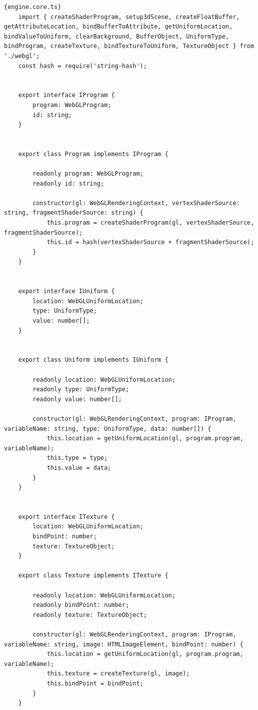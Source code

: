 \begin{lstlisting}{engine.core.ts}
    import { createShaderProgram, setup3dScene, createFloatBuffer, getAttributeLocation, bindBufferToAttribute, getUniformLocation, bindValueToUniform, clearBackground, BufferObject, UniformType, bindProgram, createTexture, bindTextureToUniform, TextureObject } from './webgl';
    const hash = require('string-hash');
    
    
    export interface IProgram {
        program: WebGLProgram;
        id: string;
    }
    
    
    export class Program implements IProgram {
    
        readonly program: WebGLProgram;
        readonly id: string;
    
        constructor(gl: WebGLRenderingContext, vertexShaderSource: string, fragmentShaderSource: string) {
            this.program = createShaderProgram(gl, vertexShaderSource, fragmentShaderSource);
            this.id = hash(vertexShaderSource + fragmentShaderSource);
        }
    }
    
    
    export interface IUniform {
        location: WebGLUniformLocation;
        type: UniformType;
        value: number[];
    }
    
    
    export class Uniform implements IUniform {
    
        readonly location: WebGLUniformLocation;
        readonly type: UniformType;
        readonly value: number[];
    
        constructor(gl: WebGLRenderingContext, program: IProgram, variableName: string, type: UniformType, data: number[]) {
            this.location = getUniformLocation(gl, program.program, variableName);
            this.type = type;
            this.value = data;
        }
    }
    
    
    export interface ITexture {
        location: WebGLUniformLocation;
        bindPoint: number;
        texture: TextureObject;
    }
    
    export class Texture implements ITexture {
    
        readonly location: WebGLUniformLocation;
        readonly bindPoint: number;
        readonly texture: TextureObject;
    
        constructor(gl: WebGLRenderingContext, program: IProgram, variableName: string, image: HTMLImageElement, bindPoint: number) {
            this.location = getUniformLocation(gl, program.program, variableName);
            this.texture = createTexture(gl, image);
            this.bindPoint = bindPoint;
        }
    }
    

\end{lstlisting}
